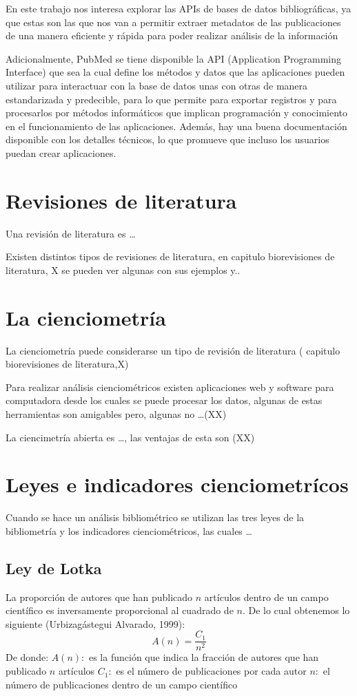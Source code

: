 \documentclass[../Main.tex]{subfiles}
\begin{document}
 \smallskip
En este trabajo nos interesa explorar las APIs de bases de datos bibliográficas, ya que estas son las que nos van a permitir extraer metadatos de las publicaciones de una manera eficiente y rápida para poder realizar análisis de la información  

\smallskip
Adicionalmente, PubMed se tiene disponible la API (Application Programming Interface) que sea la cual define los métodos y datos que las aplicaciones pueden utilizar para interactuar con la base de datos unas con otras de manera estandarizada y predecible, para lo que permite para exportar registros y para procesarlos por métodos informáticos que implican programación y conocimiento en el funcionamiento de las aplicaciones. Además, hay una buena documentación disponible con los detalles técnicos, lo que promueve que incluso los usuarios puedan crear aplicaciones. 

\section{Revisiones de literatura}
\noindent
Una revisión de literatura es … 

\smallskip
Existen distintos tipos de revisiones de literatura, en   capitulo biorevisiones de literatura, X se pueden ver algunas con sus ejemplos y..

\section{La cienciometría}
\noindent
La cienciometría puede considerarse un tipo de revisión de literatura ( capitulo biorevisiones de literatura,X) 

 \smallskip
Para realizar análisis cienciométricos existen aplicaciones web y software para computadora desde los cuales se puede procesar los datos, algunas de estas herramientas son amigables pero, algunas no …(XX) 

\smallskip
La ciencimetría abierta es …, las ventajas de esta son (XX)  

\section{Leyes e indicadores cienciometrícos}
\noindent
Cuando se hace un análisis bibliométrico se utilizan las tres leyes de la bibliometría y los indicadores cienciométricos, las cuales …  

\subsection{Ley de Lotka}
\noindent
La proporción de autores que han publicado $n$ artículos dentro de un campo científico es inversamente proporcional al cuadrado de $n$. De lo cual obtenemos lo siguiente (Urbizagástegui Alvarado, 1999):
$$A(n)=\frac{C_1}{n^2}$$
De donde: 
$A(n):$ es la función que indica la fracción de autores que han publicado $n$ artículos 
$C_1:$ es el número de publicaciones por cada autor  
$n:$ el número de publicaciones dentro de un campo científico  
\end{document}

